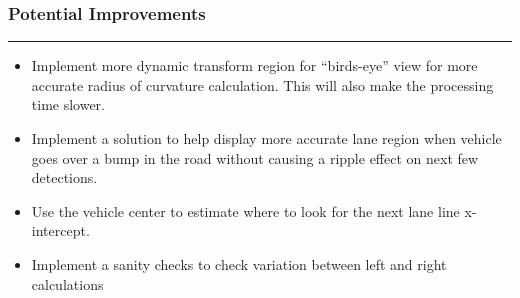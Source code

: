 \documentclass[11pt]{article}
\providecommand{\tightlist}{%
      \setlength{\itemsep}{0pt}\setlength{\parskip}{0pt}}
\begin{document}
\hypertarget{potential-improvements}{%
\subsubsection{Potential Improvements}\label{potential-improvements}}

\begin{center}\rule{0.5\linewidth}{\linethickness}\end{center}

\begin{itemize}
\tightlist
\item
  Implement more dynamic transform region for ``birds-eye'' view for
  more accurate radius of curvature calculation. This will also make the
  processing time slower.
\item
  Implement a solution to help display more accurate lane region when
  vehicle goes over a bump in the road without causing a ripple effect
  on next few detections.
\item
  Use the vehicle center to estimate where to look for the next lane
  line x-intercept.
\item
  Implement a sanity checks to check variation between left and right
  calculations
\end{itemize}


    
    
    
    
\end{document}
